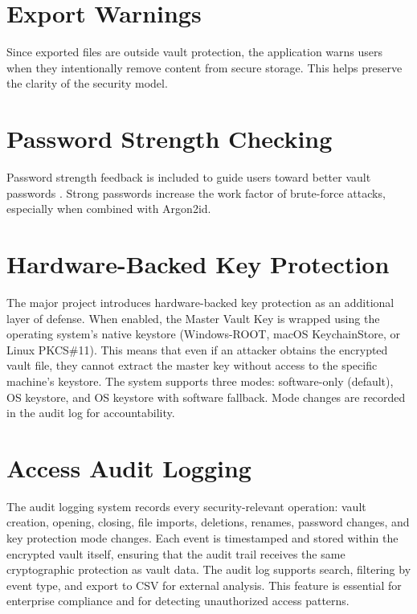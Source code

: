 \section{Export Warnings}
Since exported files are outside vault protection, the application warns users when they intentionally remove content from secure storage. This helps preserve the clarity of the security model.

\section{Password Strength Checking}
Password strength feedback is included to guide users toward better vault passwords \cite{bonneau_passwords, nist_password}. Strong passwords increase the work factor of brute-force attacks, especially when combined with Argon2id.

\section{Hardware-Backed Key Protection}
The major project introduces hardware-backed key protection  as an additional layer of defense. When enabled, the Master Vault Key is wrapped using the operating system's native keystore (Windows-ROOT, macOS KeychainStore, or Linux PKCS\#11). This means that even if an attacker obtains the encrypted vault file, they cannot extract the master key without access to the specific machine's keystore. The system supports three modes: software-only (default), OS keystore, and OS keystore with software fallback. Mode changes are recorded in the audit log for accountability.

\section{Access Audit Logging}
The audit logging system  records every security-relevant operation: vault creation, opening, closing, file imports, deletions, renames, password changes, and key protection mode changes. Each event is timestamped and stored within the encrypted vault itself, ensuring that the audit trail receives the same cryptographic protection as vault data. The audit log supports search, filtering by event type, and export to CSV for external analysis. This feature is essential for enterprise compliance and for detecting unauthorized access patterns.

